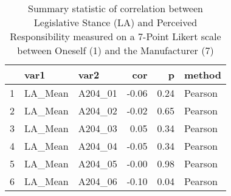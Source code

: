 \begin{table}[ht]
\centering
\begin{tabular}{rllrrl}
  \hline
 & var1 & var2 & cor & p & method \\ 
  \hline
1 & LA\_Mean & A204\_01 & -0.06 & 0.24 & Pearson \\ 
  2 & LA\_Mean & A204\_02 & -0.02 & 0.65 & Pearson \\ 
  3 & LA\_Mean & A204\_03 & 0.05 & 0.34 & Pearson \\ 
  4 & LA\_Mean & A204\_04 & -0.05 & 0.34 & Pearson \\ 
  5 & LA\_Mean & A204\_05 & -0.00 & 0.98 & Pearson \\ 
  6 & LA\_Mean & A204\_06 & -0.10 & 0.04 & Pearson \\ 
   \hline
\end{tabular}
\caption{Summary statistic of correlation between Legislative Stance (LA) and Perceived Responsibility measured on a 7-Point Likert scale between Oneself (1) and the Manufacturer (7)} 
\end{table}
